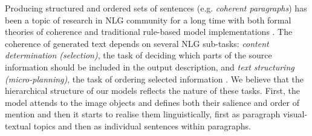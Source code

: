 \documentclass[11pt,a4paper]{article}
\newcommand{\kibitz}[2]{\ifnum\Comments=1\textcolor{#1}{#2}\fi}
\newcommand{\nikolai}[1]{\kibitz{red}  {[Nikolai: #1]}}
\begin{document}
Producing structured and ordered sets of sentences (e.g. \textit{coherent paragraphs}) has been a topic of research in NLG community for a long time with both formal theories of coherence \cite{grosz95,Barzilay2008} and traditional rule-based model implementations \cite{Reiter00buildingnatural,Deemter:2016aa}.
The coherence of generated text depends on several NLG sub-tasks: \textit{content determination (selection)}, the task of deciding which parts of the source information should be included in the output description, and \textit{text structuring (micro-planning)}, the task of ordering selected information \cite{Gatt2017}.
We believe that the hierarchical structure of our models reflects the nature of these tasks. First, the model attends to the image objects and defines both their salience and order of mention and then it starts to realise them linguistically, first as paragraph visual-textual topics and then as individual sentences within paragraphs.

\end{document}
